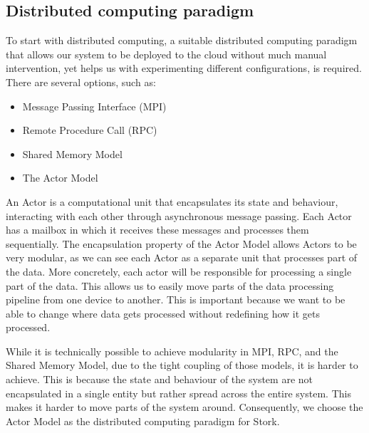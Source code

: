 \documentclass[a4paper]{article}
\begin{document}
\subsection{Distributed computing paradigm}
\label{sec:distributedcomputingparadigm}
To start with distributed computing, a suitable distributed computing paradigm that allows our system to be deployed to the cloud without much manual intervention, yet helps us with experimenting different configurations, is required. There are several options, such as:
\begin{itemize}
    \item Message Passing Interface (MPI)\cite{MPI}
    \item Remote Procedure Call (RPC)\cite{RPC}
    \item Shared Memory Model\cite{SMM}
    \item The Actor Model\cite{ActorModel}
\end{itemize}
An Actor is a computational unit that encapsulates its state and behaviour, interacting with each other through asynchronous message passing. Each Actor has a mailbox in which it receives these messages and processes them sequentially. The encapsulation property of the Actor Model allows Actors to be very modular, as we can see each Actor as a separate unit that processes part of the data. More concretely, each actor will be responsible for processing a single part of the data. This allows us to easily move parts of the data processing pipeline from one device to another. This is important because we want to be able to change where data gets processed without redefining how it gets processed.

While it is technically possible to achieve modularity in MPI, RPC, and the Shared Memory Model, due to the tight coupling of those models, it is harder to achieve. This is because the state and behaviour of the system are not encapsulated in a single entity but rather spread across the entire system. This makes it harder to move parts of the system around. Consequently, we choose the Actor Model as the distributed computing paradigm for Stork.
\end{document}

